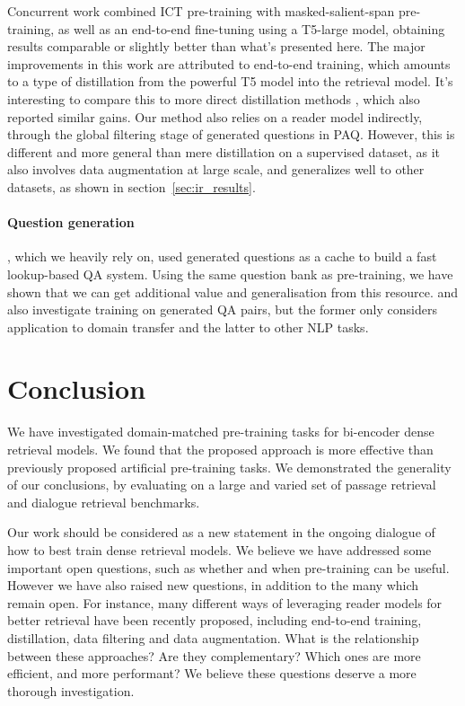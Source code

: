 \documentclass[11pt]{article}
\begin{document}
Concurrent work \citep{sachan2021end} combined ICT pre-training with masked-salient-span pre-training, as well as an end-to-end fine-tuning using a T5-large model, obtaining results comparable or slightly better than what's presented here.  The major improvements in this work are attributed to end-to-end training, which amounts to a type of distillation from the powerful T5 model into the retrieval model.  It's interesting to compare this to more direct distillation methods \citep{izacard2020distilling, yang2020retriever}, which also reported similar gains.  Our method also relies on a reader model indirectly, through the global filtering stage of generated questions in PAQ.  However, this is different and more general than mere distillation on a supervised dataset, as it also involves data augmentation at large scale, and generalizes well to other datasets, as shown in section~\ref{sec:ir_results}. 

\paragraph{Question generation}
\citet{lewis2021paq}, which we heavily rely on, used generated questions as a cache to build a fast lookup-based QA system.  Using the same question bank as pre-training, we have shown that we can get additional value and generalisation from this resource.  \citet{ma2021zero} and \citet{jia2021question} also investigate training on generated QA pairs, but the former only considers application to domain transfer and the latter to other NLP tasks.






 
\section{Conclusion}
We have investigated domain-matched pre-training tasks for bi-encoder dense retrieval models.  We found that the proposed approach is more effective than previously proposed artificial pre-training tasks.  We demonstrated the generality of our conclusions, by evaluating on a large and varied set of passage retrieval and dialogue retrieval benchmarks. 

Our work should be considered as a new statement in the ongoing dialogue of how to best train dense retrieval models.  We believe we have addressed some important open questions, such as whether and when pre-training can be useful.  However we have also raised new questions, in addition to the many which remain open.  For instance, many different ways of leveraging reader models for better retrieval have been recently proposed, including end-to-end training, distillation, data filtering and data augmentation.  What is the relationship between these approaches?  Are they complementary?  Which ones are more efficient, and more performant?  We believe these questions deserve a more thorough investigation.
\end{document}
